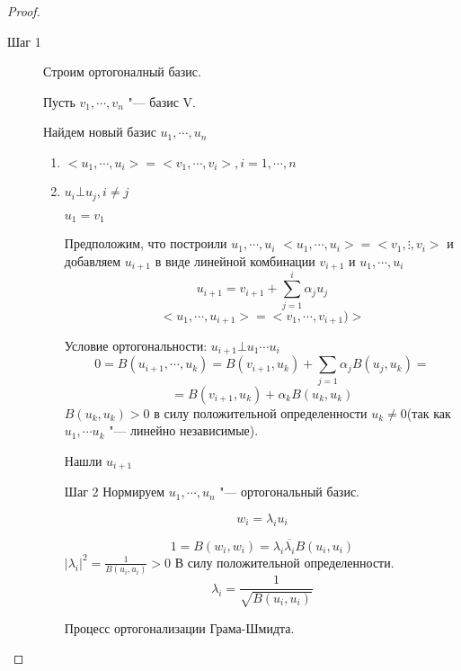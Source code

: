 \begin{proof}
 \begin{description}
  \item[Шаг 1]  Строим ортогоналный базис.

  Пусть $v_1, \cdots, v_n$ "--- базис V.

  Найдем новый базис $u_1, \cdots, u_n$
  \begin{enumerate}
  \item $<u_1, \cdots, u_i> = <v_1,\cdots, v_i>, i = 1, \cdots, n$
  \item $u_i \bot u_j, i \ne j$

  $u_1 = v_1$

  Предположим, что построили $u_1, \cdots, u_i$
  $<u_1, \cdots, u_i> = <v_1, \vdots, v_i>$ и
  добавляем $u_{i + 1}$ в виде линейной комбинации $v_{i + 1}$ и $u_1, \cdots, u_i$
  $$u_{i + 1} = v_{i + 1} + \sum_{j = 1}^{i} \alpha_{j}u_j$$
  $$<u_1, \cdots, u_{i + 1}> = <v_1, \cdots, v_{i + 1})> $$

  Условие ортогональности: $u_{i + 1} \bot u_1 \cdots u_i$
  $$0 = B(u_{i + 1}, \cdots, u_k) = B(v_{i + 1}, u_k) + \sum_{j = 1} \alpha_j B(u_j, u_k) = $$
  $$= B(v_{i + 1}, u_k)  + \alpha_{k}B(u_k, u_k)$$
  $B(u_k, u_k) > 0$ в силу положительной определенности $u_k \ne 0$(так как $u_1, \cdots u_k$ "--- линейно независимые).
  
  Нашли $u_{i + 1}$
  \item[Шаг 2] Нормируем 
  $u_1, \cdots, u_n$ "--- ортогональный базис.

  $$w_i = \lambda_i u_i$$
  
  $$1 = B(w_i, w_i) = \lambda_i \overline{\lambda_i}B(u_i, u_i) $$
  $|\lambda_i|^2 = \frac{1}{B(u_i, u_i)} > 0$ В силу положительной определенности.
  $$\lambda_i = \frac{1}{\sqrt{B(u_i, u_i)}}$$

  Процесс ортогонализации Грама-Шмидта.
  \end{enumerate}
 \end{description}
\end{proof}